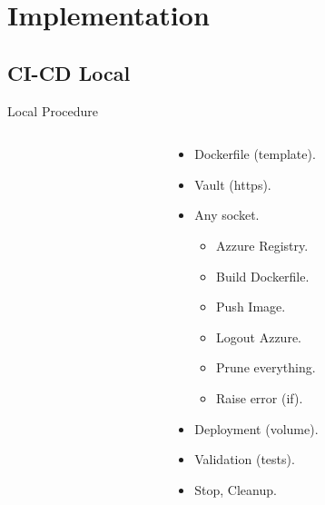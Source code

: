 \section{Implementation} \label{sec:implementation}
\subsection{CI-CD Local}

\begin{frame}{Local Procedure}
	\begin{columns}[T] %
		\begin{column}{5cm} %
		\end{column}
		\begin{column}{5cm} %
			\begin{itemize}
				\item<+-| alert@+> Dockerfile (template).
				\item<+-| alert@+> Vault (https).
				\item<+-| alert@+> Any socket.
					\begin{itemize}
						\item<+-| alert@+> Azzure Registry.
						\item<+-| alert@+> Build Dockerfile.
						\item<+-| alert@+> Push Image.
						\item<+-| alert@+> Logout Azzure.
						\item<+-| alert@+> Prune everything.
						\item<+-| alert@+> Raise error (if).
					\end{itemize}
				\item<+-| alert@+> Deployment (volume).
				\item<+-| alert@+> Validation (tests).
				\item<+-| alert@+> Stop, Cleanup.
			\end{itemize}
		\end{column}
	\end{columns}
\end{frame}

